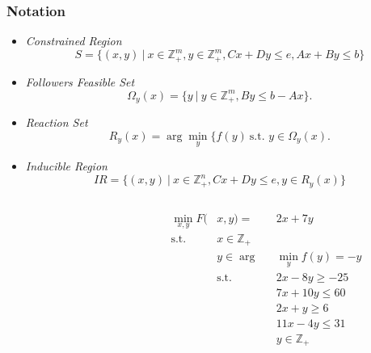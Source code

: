 \documentclass[11pt]{beamer}
\begin{document}
\begin{frame}
	\frametitle{Notation}
	\begin{itemize}
		\item \textit{Constrained Region}
		\begin{equation*}
		S = \{(x,y) \ | \ x \in \mathbb{Z}^m_+, y \in \mathbb{Z}^m_+, Cx+Dy \le e, Ax + By \le b \}
		\end{equation*}
		\item \textit{Followers Feasible Set}
		\begin{equation*}
			\Omega_y(x) = \{y \ | \ y \in \mathbb{Z}^m_+, By \le b - Ax \}.
		\end{equation*}
		\item \textit{Reaction Set}
		\begin{equation*}
			R_y(x) = \arg \min_y \{f(y) \ \text{s.t. } y \in \Omega_y(x).
		\end{equation*}
		\item \textit{Inducible Region}
		\begin{equation*}
			IR = \{(x,y) \ | \ x \in \mathbb{Z}^n_+, Cx+Dy \le e, y \in R_y(x)\}
		\end{equation*}
	\end{itemize}
\end{frame}

\begin{frame}
	\begin{columns}[T] %
		\begin{column}{.48\textwidth}
			
		\end{column}%
		\hfill%
		\begin{column}{.48\textwidth}
			\begin{alignat*}{2}
				\min_{x,y} F(&x,y) =&& 2x + 7y \\
				\text{s.t.}\quad &x \in \mathbb{Z}_+&& \\
				&y \in \arg&& \min_y f(y) = -y \\
				&\text{s.t.}\quad &&2x - 8y \ge -25 \\
				& &&7x + 10y \le 60 \\
				& &&2x + y \ge 6 \\
				& &&11x - 4y \le 31 \\
				& &&y \in \mathbb{Z}_+ 
			\end{alignat*}
		\end{column}%
	\end{columns}
	
\end{frame}
\end{document}
